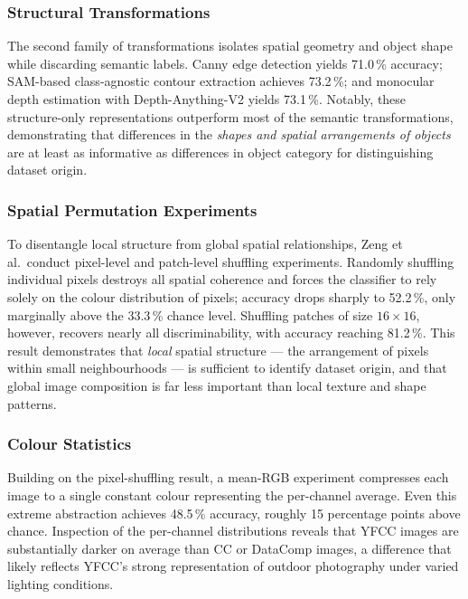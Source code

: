 \subsubsection*{Structural Transformations}

The second family of transformations isolates spatial geometry and object shape while
discarding semantic labels.  Canny edge detection yields 71.0\,\% accuracy; SAM-based
class-agnostic contour extraction achieves 73.2\,\%; and monocular depth estimation with
Depth-Anything-V2 yields 73.1\,\%.  Notably, these structure-only representations
outperform most of the semantic transformations, demonstrating that differences in the
\emph{shapes and spatial arrangements of objects} are at least as informative as differences
in object category for distinguishing dataset origin.

\subsubsection*{Spatial Permutation Experiments}

To disentangle local structure from global spatial relationships, Zeng et al.\ conduct
pixel-level and patch-level shuffling experiments.  Randomly shuffling individual pixels
destroys all spatial coherence and forces the classifier to rely solely on the colour
distribution of pixels; accuracy drops sharply to 52.2\,\%, only marginally above the 33.3\,\%
chance level.  Shuffling patches of size $16\!\times\!16$, however, recovers nearly all
discriminability, with accuracy reaching 81.2\,\%.  This result demonstrates that
\emph{local} spatial structure --- the arrangement of pixels within small neighbourhoods ---
is sufficient to identify dataset origin, and that global image composition is far less
important than local texture and shape patterns.

\subsubsection*{Colour Statistics}

Building on the pixel-shuffling result, a mean-RGB experiment compresses each image to a
single constant colour representing the per-channel average.  Even this extreme abstraction
achieves 48.5\,\% accuracy, roughly 15 percentage points above chance.  Inspection of the
per-channel distributions reveals that YFCC images are substantially darker on average than
CC or DataComp images, a difference that likely reflects YFCC's strong representation of
outdoor photography under varied lighting conditions.

